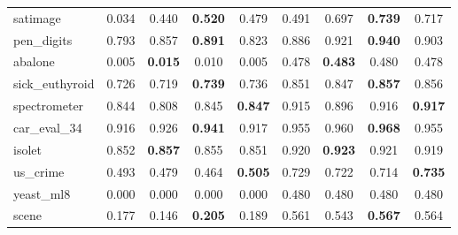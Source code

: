 \begin{figure}[ht]
\begin{tabular}{p{22mm}|*4{p{14mm}}|*4{p{14mm}}}
        satimage&\multicolumn{1}{c}{0.034}&\multicolumn{1}{c}{0.440}&\multicolumn{1}{c}{\textbf{0.520}}&\multicolumn{1}{c|}{0.479}&\multicolumn{1}{c}{0.491}&\multicolumn{1}{c}{0.697}&\multicolumn{1}{c}{\textbf{0.739}}&\multicolumn{1}{c}{0.717}\\
        pen\_digits&\multicolumn{1}{c}{0.793}&\multicolumn{1}{c}{0.857}&\multicolumn{1}{c}{\textbf{0.891}}&\multicolumn{1}{c|}{0.823}&\multicolumn{1}{c}{0.886}&\multicolumn{1}{c}{0.921}&\multicolumn{1}{c}{\textbf{0.940}}&\multicolumn{1}{c}{0.903}\\
        abalone&\multicolumn{1}{c}{0.005}&\multicolumn{1}{c}{\textbf{0.015}}&\multicolumn{1}{c}{0.010}&\multicolumn{1}{c|}{0.005}&\multicolumn{1}{c}{0.478}&\multicolumn{1}{c}{\textbf{0.483}}&\multicolumn{1}{c}{0.480}&\multicolumn{1}{c}{0.478}\\
        sick\_euthyroid&\multicolumn{1}{c}{0.726}&\multicolumn{1}{c}{0.719}&\multicolumn{1}{c}{\textbf{0.739}}&\multicolumn{1}{c|}{0.736}&\multicolumn{1}{c}{0.851}&\multicolumn{1}{c}{0.847}&\multicolumn{1}{c}{\textbf{0.857}}&\multicolumn{1}{c}{0.856}\\
        spectrometer&\multicolumn{1}{c}{0.844}&\multicolumn{1}{c}{0.808}&\multicolumn{1}{c}{0.845}&\multicolumn{1}{c|}{\textbf{0.847}}&\multicolumn{1}{c}{0.915}&\multicolumn{1}{c}{0.896}&\multicolumn{1}{c}{0.916}&\multicolumn{1}{c}{\textbf{0.917}}\\
        car\_eval\_34&\multicolumn{1}{c}{0.916}&\multicolumn{1}{c}{0.926}&\multicolumn{1}{c}{\textbf{0.941}}&\multicolumn{1}{c|}{0.917}&\multicolumn{1}{c}{0.955}&\multicolumn{1}{c}{0.960}&\multicolumn{1}{c}{\textbf{0.968}}&\multicolumn{1}{c}{0.955}\\
        isolet&\multicolumn{1}{c}{0.852}&\multicolumn{1}{c}{\textbf{0.857}}&\multicolumn{1}{c}{0.855}&\multicolumn{1}{c|}{0.851}&\multicolumn{1}{c}{0.920}&\multicolumn{1}{c}{\textbf{0.923}}&\multicolumn{1}{c}{0.921}&\multicolumn{1}{c}{0.919}\\
        us\_crime&\multicolumn{1}{c}{0.493}&\multicolumn{1}{c}{0.479}&\multicolumn{1}{c}{0.464}&\multicolumn{1}{c|}{\textbf{0.505}}&\multicolumn{1}{c}{0.729}&\multicolumn{1}{c}{0.722}&\multicolumn{1}{c}{0.714}&\multicolumn{1}{c}{\textbf{0.735}}\\
        yeast\_ml8&\multicolumn{1}{c}{0.000}&\multicolumn{1}{c}{0.000}&\multicolumn{1}{c}{0.000}&\multicolumn{1}{c|}{0.000}&\multicolumn{1}{c}{0.480}&\multicolumn{1}{c}{0.480}&\multicolumn{1}{c}{0.480}&\multicolumn{1}{c}{0.480}\\
        scene&\multicolumn{1}{c}{0.177}&\multicolumn{1}{c}{0.146}&\multicolumn{1}{c}{\textbf{0.205}}&\multicolumn{1}{c|}{0.189}&\multicolumn{1}{c}{0.561}&\multicolumn{1}{c}{0.543}&\multicolumn{1}{c}{\textbf{0.567}}&\multicolumn{1}{c}{0.564}\\

\end{tabular}
\end{figure}
